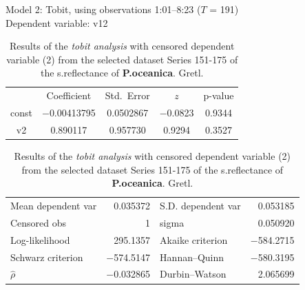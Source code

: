 \documentclass[10pt, a4paper]{article}
\begin{document}
\begin{appendices}
\begin{table}[H]
\begin{center}
\caption{Results of the \textit{tobit analysis} with censored dependent variable (2) from the selected dataset Series 151-175 of the s.reflectance of \textbf{P.oceanica}. Gretl.}
Model 2: Tobit, using observations 1:01--8:23 ($T$ = 191)\\
Dependent variable: v12\\
\vspace{1em}
\begin{tabular}{|c c c c c|}
  &  {Coefficient} &    {Std.\ Error} & {$z$} & {p-value} \\[1ex]
const &   $-$0.00413795 &     0.0502867 &     $-$0.0823 &         0.9344 \\
v2 &   0.890117 &     0.957730 &       0.9294 &         0.3527 \\
\end{tabular}

\vspace{1ex}
\begin{tabular}{lrlr}
Mean dependent var &  0.035372 & S.D. dependent var &  0.053185 \\
Censored obs &         1 & sigma &  0.050920 \\
Log-likelihood &  295.1357 & Akaike criterion & $-$584.2715 \\
Schwarz criterion & $-$574.5147 & Hannan--Quinn & $-$580.3195 \\
$\hat{\rho}$ & $-$0.032865 & Durbin--Watson &  2.065699 \\
\end{tabular}


\end{center}
\end{table}
\end{appendices}
\end{document}
